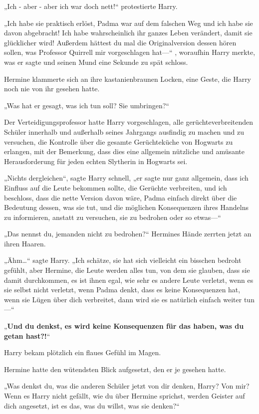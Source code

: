 {„Ich - aber - aber ich war doch nett!“ protestierte Harry.

„Ich habe sie praktisch erlöst, Padma war auf dem falschen Weg und ich habe sie davon abgebracht! Ich habe wahrscheinlich ihr ganzes Leben verändert, damit sie glücklicher wird! Außerdem hättest du mal die Originalversion dessen hören sollen, was Professor Quirrell mir vorgeschlagen hat—“ , woraufhin Harry merkte, was er sagte und seinen Mund eine Sekunde zu spät schloss.

Hermine klammerte sich an ihre kastanienbraunen Locken, eine Geste, die Harry noch nie von ihr gesehen hatte.

„Was hat er gesagt, was ich tun soll? Sie umbringen?“

Der Verteidigungsprofessor hatte Harry vorgeschlagen, alle gerüchteverbreitenden Schüler innerhalb und außerhalb seines Jahrgangs ausfindig zu machen und zu versuchen, die Kontrolle über die gesamte Gerüchteküche von Hogwarts zu erlangen, mit der Bemerkung, dass dies eine allgemein nützliche und amüsante Herausforderung für jeden echten Slytherin in Hogwarts sei.

„Nichts dergleichen“, sagte Harry schnell, „er sagte nur ganz allgemein, dass ich Einfluss auf die Leute bekommen sollte, die Gerüchte verbreiten, und ich beschloss, dass die nette Version davon wäre, Padma einfach direkt über die Bedeutung dessen, was sie tut, und die möglichen Konsequenzen ihres Handelns zu informieren, anstatt zu versuchen, sie zu bedrohen oder so etwas—“

„Das nennst du, jemanden nicht zu bedrohen?“ Hermines Hände zerrten jetzt an ihren Haaren.

„Ähm…“ sagte Harry. „Ich schätze, sie hat sich vielleicht ein bisschen bedroht gefühlt, aber Hermine, die Leute werden alles tun, von dem sie glauben, dass sie damit durchkommen, es ist ihnen egal, wie sehr es andere Leute verletzt, wenn es sie selbst nicht verletzt, wenn Padma denkt, dass es keine Konsequenzen hat, wenn sie Lügen über dich verbreitet, dann wird sie es natürlich einfach weiter tun—“

„\textbf{Und du denkst, es wird keine Konsequenzen für das haben, was du getan hast?!}“

Harry bekam plötzlich ein flaues Gefühl im Magen.

Hermine hatte den wütendsten Blick aufgesetzt, den er je gesehen hatte.

„Was denkst du, was die anderen Schüler jetzt von dir denken, Harry? Von mir? Wenn es Harry nicht gefällt, wie du über Hermine sprichst, werden Geister auf dich angesetzt, ist es das, was du willst, was sie denken?“

}

